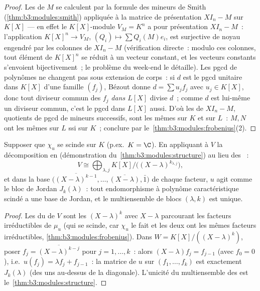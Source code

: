 \begin{proof}
Les  de $M$ se calculent par la formule
des mineurs de Smith (\cref{thm:b3:modules:smith}) appliquée à la
matrice de présentation $XI_n - M$ sur $K[X]$ --- en effet le
$K[X]$-module $V_M = K^n$ a pour présentation $XI_n - M$~:
l'application $K[X]^n \to V_M$, $(Q_i) \mapsto \sum Q_i(M)e_i$,
est surjective de noyau engendré par les colonnes de $XI_n - M$
(vérification directe~: modulo ces colonnes, tout élément de
$K[X]^n$ se réduit à un vecteur constant, et les vecteurs
constants s'envoient bijectivement~; le problème du week-end le
détaille). Les pgcd de polynômes ne changent pas sous extension
de corps~: si $d$ est le pgcd unitaire dans $K[X]$ d'une famille
$(f_j)$, Bézout donne $d = \sum u_jf_j$ avec $u_j \in K[X]$,
donc tout diviseur commun des $f_j$ \emph{dans $L[X]$} divise
$d$~; comme $d$ est lui-même un diviseur commun, c'est le pgcd
dans $L[X]$ aussi. D'où les  de $XI_n - M$,
quotients de pgcd de mineurs successifs, sont les mêmes sur $K$
et sur $L$~: $M, N$ ont les mêmes  sur
$L$ ssi sur $K$~; conclure par
le~\cref{thm:b3:modules:frobenius}(2).
\end{proof}

\begin{theorem}\label{thm:b3:modules:jordan}
Supposer que $\chi_u$ se scinde sur $K$ (p.ex.\ $K = \C$). En
appliquant à $V$ la décomposition en 
(démonstration du~\cref{thm:b3:modules:structure}) au lieu des
~:
\[
V \cong \bigoplus_{\lambda, j} K[X]\big/\bigl((X -
\lambda)^{k_{\lambda,j}}\bigr),
\]
et dans la base $\bigl(\overline{(X-\lambda)^{k-1}}, \dots,
\overline{(X - \lambda)}, \bar 1\bigr)$ de chaque facteur, $u$
agit comme le bloc de Jordan $J_k(\lambda)$~: tout endomorphisme
à polynôme caractéristique scindé a une base de Jordan, et le
multiensemble de blocs $(\lambda, k)$ est unique.
\end{theorem}

\begin{proof}
Les  du  de  $V$ sont les
$(X - \lambda)^k$ avec $X - \lambda$ parcourant les facteurs
irréductibles de $\mu_u$ (qui se scinde, car $\chi_u$ le fait et
les deux ont les mêmes facteurs irréductibles,
\cref{thm:b3:modules:frobenius}). Dans $W =
K[X]/((X-\lambda)^k)$, poser $f_j = \overline{(X -
\lambda)^{k-j}}$ pour $j = 1, \dots, k$~: alors $(X - \lambda)f_j
= f_{j-1}$ (avec $f_0 = 0$), i.e.\ $u(f_j) = \lambda f_j +
f_{j-1}$~: la matrice de $u$ sur $(f_1, \dots, f_k)$ est
exactement $J_k(\lambda)$ (des uns au-dessus de la diagonale).
L'unicité du multiensemble des  est
le~\cref{thm:b3:modules:structure}.
\end{proof}


